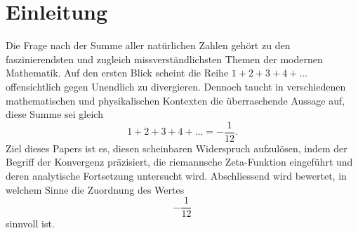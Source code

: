 %
%
%
%
\section{Einleitung\label{Einleitung}}

Die Frage nach der Summe aller natürlichen Zahlen gehört zu den faszinierendsten und zugleich missverständlichsten Themen der modernen Mathematik. 
Auf den ersten Blick scheint die Reihe 
%
$1 + 2 + 3 + 4 + \dots$
offensichtlich gegen Unendlich zu divergieren. 
Dennoch taucht in verschiedenen mathematischen und physikalischen Kontexten die überraschende Aussage auf, diese Summe sei gleich 
\[
1 + 2 + 3 + 4 + \ldots = -\frac{1}{12}.
\]
Ziel dieses Papers ist es, diesen scheinbaren Widerspruch aufzulösen, indem der Begriff der Konvergenz präzisiert, die riemannsche Zeta-Funktion eingeführt und deren analytische Fortsetzung untersucht wird. 
Abschliessend wird bewertet, in welchem Sinne die Zuordnung des Wertes
\[
-\frac{1}{12}
\] 
sinnvoll ist. 
